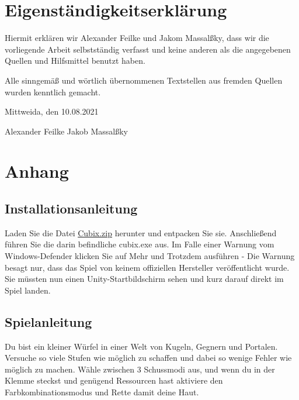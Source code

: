\documentclass[a4paper,10pt,ngerman,fontsize=12pt]{scrreprt}
\begin{document}
\chapter{Eigenständigkeitserklärung}

Hiermit erklären wir Alexander Feilke und Jakom Massal{\ss}ky, dass wir die vorliegende Arbeit selbstständig verfasst und keine anderen als die angegebenen Quellen und Hilfsmittel benutzt haben.

Alle sinngemä{\ss} und wörtlich übernommenen Textstellen aus fremden Quellen wurden kenntlich gemacht.

Mittweida, den 10.08.2021

\vspace{2cm}

Alexander Feilke \hspace{4cm} Jakob Massal{\ss}ky





\newpage
\newpage
\chapter{Anhang}




\section{Installationsanleitung}

Laden Sie die Datei \href{https://www.dropbox.com/s/g82vexjznq1x9dd/Cubix.zip?dl=1}{Cubix.zip} herunter und entpacken Sie sie. Anschließend führen Sie die darin befindliche cubix.exe aus.
Im Falle einer Warnung vom Windows-Defender klicken Sie auf Mehr und Trotzdem ausführen - Die Warnung besagt nur, dass das Spiel von keinem offiziellen Hersteller veröffentlicht wurde.
Sie müssten nun einen Unity-Startbildschirm sehen und kurz darauf direkt im Spiel landen.




\section{Spielanleitung}

Du bist ein kleiner Würfel in einer Welt von Kugeln, Gegnern und Portalen. Versuche so viele Stufen wie möglich zu schaffen und dabei so wenige Fehler wie möglich zu machen. Wähle zwischen 3 Schussmodi aus, und wenn du in der Klemme steckst und genügend Ressourcen hast aktiviere den Farbkombinationsmodus und Rette damit deine Haut.
\end{document}

